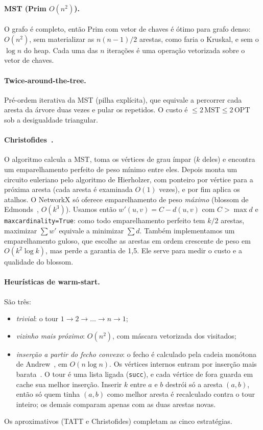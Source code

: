 \paragraph{MST (Prim $O(n^2)$).} O grafo é completo, então Prim com vetor de
chaves é ótimo para grafo denso: $O(n^2)$, sem materializar as $n(n-1)/2$
arestas, como faria o Kruskal, e sem o $\log n$ do heap. Cada uma das $n$
iterações é uma operação vetorizada sobre o vetor de chaves.

\paragraph{Twice-around-the-tree.} Pré-ordem iterativa da MST (pilha
explícita), que equivale a percorrer cada aresta da árvore duas vezes e pular
os repetidos. O custo é $\le 2\,\mathrm{MST}\le 2\,\mathrm{OPT}$ sob a
desigualdade triangular.

\paragraph{Christofides~\cite{christofides1976}.} O algoritmo calcula a MST,
toma os vértices de grau ímpar ($k$ deles) e encontra um emparelhamento
perfeito de peso mínimo entre eles. Depois monta um circuito euleriano pelo
algoritmo de Hierholzer, com ponteiro por vértice para a próxima aresta
(cada aresta é examinada $O(1)$ vezes), e por fim aplica os atalhos. O
NetworkX só oferece emparelhamento de peso \emph{máximo} (blossom de
Edmonds~\cite{edmonds1965,galil1986}, $O(k^3)$). Usamos então
$w'(u,v)=C-d(u,v)$ com $C>\max d$ e \texttt{maxcardinality=True}: como todo
emparelhamento perfeito tem $k/2$ arestas, maximizar $\sum w'$ equivale a
minimizar $\sum d$. Também implementamos um emparelhamento guloso, que
escolhe as arestas em ordem crescente de peso em $O(k^2\log k)$, mas perde a
garantia de 1,5. Ele serve para medir o custo e a qualidade do blossom.

\paragraph{Heurísticas de warm-start.} São três:
\begin{itemize}
  \item \emph{trivial}: o tour $1\to2\to\dots\to n\to 1$;
  \item \emph{vizinho mais próximo}: $O(n^2)$, com máscara vetorizada dos
    visitados;
  \item \emph{inserção a partir do fecho convexo}: o fecho é calculado pela
    cadeia monótona de Andrew~\cite{andrew1979}, em $O(n\log n)$. Os
    vértices internos entram por inserção mais barata~\cite{rosenkrantz1977}.
    O tour é uma lista ligada (\texttt{succ}), e cada vértice de fora guarda
    em cache sua melhor inserção. Inserir $k$ entre $a$ e $b$ destrói só a
    aresta $(a,b)$, então só quem tinha $(a,b)$ como melhor aresta é
    recalculado contra o tour inteiro; os demais comparam apenas com as duas
    arestas novas.
\end{itemize}
Os aproximativos (TATT e Christofides) completam as cinco estratégias.

